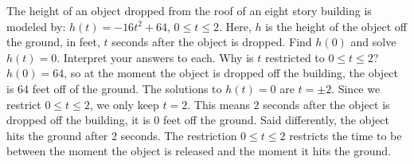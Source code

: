 {The height of an object dropped from the roof of an eight story building is modeled by:  $h(t) = -16t^2 + 64$, $0 \leq t \leq 2$. Here,  $h$ is the height of the object off the ground, in feet, $t$ seconds after the object is dropped.  Find $h(0)$ and solve $h(t) = 0$.  Interpret your answers to each.  Why is $t$ restricted to $0 \leq t \leq 2$?}
{$h(0) = 64$, so at the moment the object is dropped off the building, the object is $64$ feet off of the ground.  The solutions to $h(t) = 0$ are $t = \pm 2$.  Since we restrict $0 \leq t \leq 2$, we only keep $t = 2$.  This means $2$ seconds after the object is dropped off the building, it is $0$ feet off the ground.  Said differently, the object hits the ground after $2$ seconds.  The restriction  $0 \leq t \leq 2$ restricts the time to be between the moment the object is released and the moment it hits the ground.}